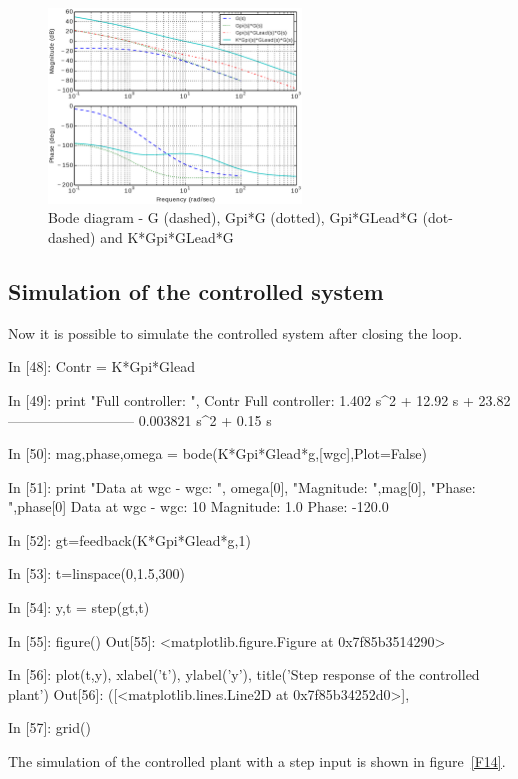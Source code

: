 \begin{figure}[htbp]	%
\centering
\includegraphics[width=0.6\textwidth]{eps/bodeplantpileadK.eps}
\caption{Bode diagram - G (dashed), Gpi*G (dotted), Gpi*GLead*G (dot-dashed) 
and K*Gpi*GLead*G}
\label{F13}
\end{figure}

\subsection{Simulation of the controlled system}

Now it is possible to simulate the controlled system after closing the loop.

\begin{code}
In [48]: Contr = K*Gpi*Glead

In [49]: print "Full controller: ", Contr
Full controller:  
1.402 s^2 + 12.92 s + 23.82
---------------------------
   0.003821 s^2 + 0.15 s

In [50]: mag,phase,omega = bode(K*Gpi*Glead*g,[wgc],Plot=False)

In [51]: print "Data at wgc - wgc: ", omega[0], "Magnitude: ",mag[0], "Phase: 
",phase[0]
Data at wgc - wgc:  10 Magnitude:  1.0 Phase:  -120.0

In [52]: gt=feedback(K*Gpi*Glead*g,1)

In [53]: t=linspace(0,1.5,300)

In [54]: y,t = step(gt,t)

In [55]: figure()
Out[55]: <matplotlib.figure.Figure at 0x7f85b3514290>

In [56]: plot(t,y), xlabel('t'), ylabel('y'), title('Step response of the 
controlled plant')
Out[56]: 
([<matplotlib.lines.Line2D at 0x7f85b34252d0>],

In [57]: grid()
\end{code}

The simulation of the controlled plant with a step input is shown in 
figure~\ref{F14}.


